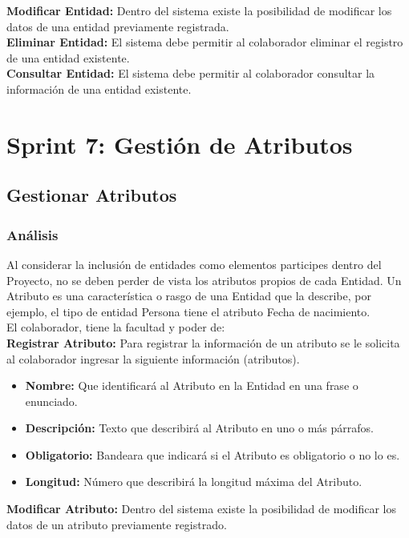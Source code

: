 \textbf {Modificar Entidad:}
Dentro del sistema existe la posibilidad de modificar los datos de una entidad previamente registrada.\\

\textbf {Eliminar Entidad:} 
El sistema debe permitir al colaborador eliminar el registro de una entidad existente.\\

\textbf {Consultar Entidad:} 
El sistema debe permitir al colaborador consultar la información de una entidad existente.


\section{Sprint 7: Gestión de Atributos}
\subsection{Gestionar Atributos}

\subsubsection {Análisis}
Al considerar la inclusión de entidades como elementos participes dentro del Proyecto, no se deben perder de vista los atributos propios de cada Entidad. Un Atributo es una característica o rasgo de una Entidad que la describe, por ejemplo, el tipo de entidad Persona tiene el atributo Fecha de nacimiento. \\

El colaborador, tiene la facultad y poder de:\\

\textbf {Registrar Atributo:}
Para registrar la información de un atributo se le solicita al colaborador ingresar la siguiente información (atributos).
\begin{itemize}
	\item \textbf{Nombre:} Que identificará al Atributo en la Entidad en una frase o enunciado.
	\item \textbf{Descripción:} Texto que describirá al Atributo  en uno o más párrafos.
	\item \textbf{Obligatorio:} Bandeara que indicará si el Atributo es obligatorio o no lo es.
	\item \textbf{Longitud:} Número que describirá la longitud máxima del Atributo.
\end{itemize}

\textbf {Modificar Atributo:}
Dentro del sistema existe la posibilidad de modificar los datos de un atributo previamente registrado.\\

